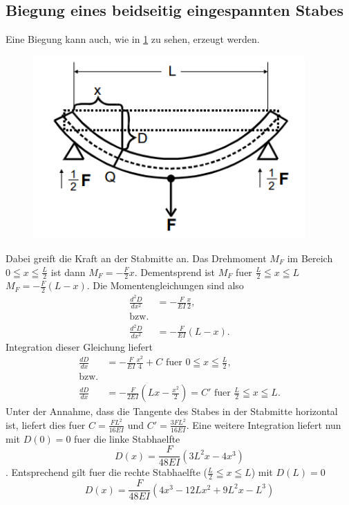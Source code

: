 \subsection{Biegung eines beidseitig eingespannten Stabes}
Eine Biegung kann auch, wie in \ref{Fig:Beidseitig} zu sehen, erzeugt werden.
\begin{figure}[H]
    \centering
    \captionsetup{justification=centering}
    \includegraphics[height=7cm]{"Beidseitig_Biegung.png"}
    \label{Fig:Beidseitig}
\end{figure}
Dabei greift die Kraft an der Stabmitte an. Das Drehmoment $M_F$ im Bereich $0\leqq x\leqq\frac{L}{2}$ ist dann $M_F=-\frac{F}{2}x$. Dementsprend ist $M_F$ fuer $\frac{L}{2}\leqq x\leqq L$ $M_F=-\frac{F}{2}(L-x)$.
Die Momentengleichungen sind also 
\begin{align*}
    \frac{d^2D}{dx^2}&=-\frac{F}{EI}\frac{x}{2},\\
    \text{bzw.}\\
    \frac{d^2D}{dx^2}&=-\frac{F}{EI}(L-x).  
\end{align*}
Integration dieser Gleichung liefert 
\begin{align*}
    \frac{dD}{dx}&=-\frac{F}{EI}\frac{x^2}{4}+C\text{  fuer  }0\leqq x \leqq\frac{L}{2},\\
    \text{bzw.}\\
    \frac{dD}{dx}&=-\frac{F}{2EI}(Lx-\frac{x^2}{2})=C'\text{  fuer  }\frac{L}{2}\leqq x\leqq L.
\end{align*}
Unter der Annahme, dass die Tangente des Stabes in der Stabmitte horizontal ist, liefert dies fuer $C=\frac{FL^2}{16EI}$ und $C'=\frac{3FL^2}{16EI}$. Eine weitere Integration liefert nun mit $D(0)=0$ fuer die linke Stabhaelfte
\begin{equation*}
    D(x)=\frac{F}{48EI}(3L^2x-4x^3)
\end{equation*}.
Entsprechend gilt fuer die rechte Stabhaelfte ($\frac{L}{2}\leqq x\leqq L$) mit $D(L)=0$ 
\begin{equation*}
    D(x)=\frac{F}{48EI}(4x^3-12Lx^2+9L^2x-L^3)
\end{equation*}
